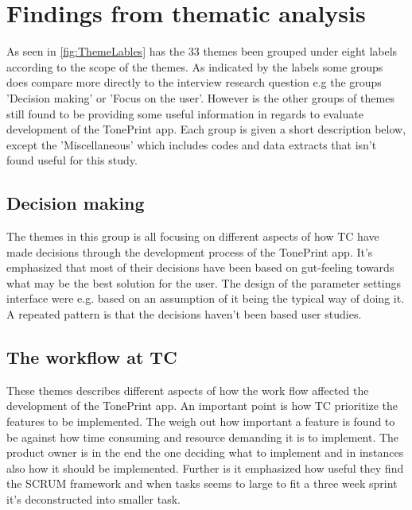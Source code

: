 \section{Findings from thematic analysis}
\label{ThematicFindings}
%
As seen in \autoref{fig:ThemeLables} has the 33 themes been grouped under eight labels according to the scope of the themes. As indicated by the labels some groups does compare more directly to the interview research question e.g the groups 'Decision making' or 'Focus on the user'. However is the other groups of themes still found to be providing some useful information in regards to evaluate development of the TonePrint app. Each group is given a short description below, except the 'Miscellaneous' which includes codes and data extracts that isn't found useful for this study.\\
\subsection*{Decision making}
The themes in this group is all focusing on different aspects of how TC have made decisions through the development process of the TonePrint app. It's emphasized that most of their decisions have been based on gut-feeling towards what may be the best solution for the user. The design of the parameter settings interface were e.g. based on an assumption of it being the typical way of doing it. A repeated pattern is that the decisions haven't been based user studies. 

\subsection*{The workflow at TC}
These themes describes different aspects of how the work flow affected the development of the TonePrint app. An important point is how TC prioritize the features to be implemented. The weigh out how important a feature is found to be against how time consuming and resource demanding it is to implement. The product owner is in the end the one deciding what to implement and in instances also how it should be implemented. Further is it emphasized how useful they find the SCRUM framework and when tasks seems to large to fit a three week sprint it's deconstructed into smaller task.  

